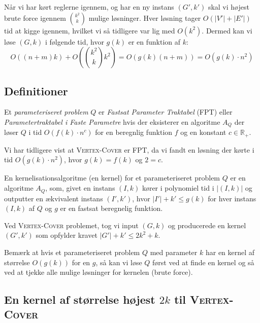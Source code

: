 Når vi har kørt reglerne igennem, og har en ny instans $(G', k')$ skal vi højest brute force igennem $\binom{k^{2}}{k}$ mulige løsninger. Hver løsning tager $O(|V'|+|E'|)$ tid at kigge igennem, hvilket vi så tidligere var lig med $O(k^{2})$. Dermed kan vi løse $(G, k)$ i følgende tid, hvor $g(k)$ er en funktion af $k$:
\begin{equation*}
	O((n+m)k) + O(\binom{k^{2}}{k}k^{2}) = O(g(k)(n+m)) = O(g(k)\cdot n^{2})
\end{equation*}

\subsection{Definitioner}%
\label{subsec:label}

\begin{definition}
	Et \textit{parameteriseret problem} $Q$ er \textit{Fastsat Parameter Traktabel} (FPT) eller \textit{Parametertraktabel i Faste Parametre} hvis der eksisterer en algoritme $A_{Q}$ der løser $Q$ i tid $O(f(k) \cdot n^{c})$ for en beregnlig funktion $f$ og en konstant $c \in \mathbb{R}_{+}$.
\end{definition}

Vi har tidligere vist at \textsc{Vertex-Cover} er FPT, da vi fandt en løsning der kørte i tid $O(g(k) \cdot n^{2})$, hvor $g(k) = f(k)$ og $2 = c$.

\begin{definition}
	En kernelisationsalgoritme (en kernel) for et parameteriseret problem $Q$ er en algoritme $A_{Q}$, som, givet en instans $(I,k)$ kører i polynomiel tid i $|(I,k)|$ og outputter en ækvivalent instans $(I', k')$, hvor $|I'| + k' \le g(k)$ for hver instans $(I, k)$ af $Q$ og $g$ er en fastsat beregnelig funktion.
\end{definition}

Ved \textsc{Vertex-Cover} problemet, tog vi input $(G, k)$ og producerede en kernel $(G', k')$ som opfylder kravet $|G'| + k' \le 2k^{2} + k$.

Bemærk at hvis et parameteriseret problem $Q$ med parameter $k$ har en kernel af størrelse $O(g(k))$ for en $g$, så kan vi løse $Q$ først ved at finde en kernel og så ved at tjekke alle mulige løsninger for kernelen (brute force).


\subsection{En kernel af størrelse højest $2k$ til \textsc{Vertex-Cover}}%
\label{subsec:kernel2k}

